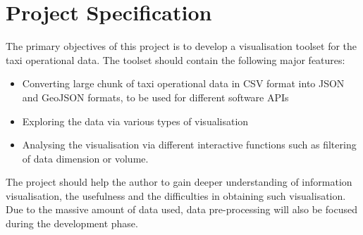 \documentclass[doc,natbib]{apa6}
\begin{document}
\section{Project Specification}
\label{sec3}

The primary objectives of this project is to develop a visualisation toolset for the taxi operational data. The toolset should contain the following major features:
\begin{itemize}
	\item Converting large chunk of taxi operational data in CSV format into JSON and GeoJSON formats, to be used for different software APIs
	\item Exploring the data via various types of visualisation
	\item Analysing the visualisation via different interactive functions such as filtering of data dimension or volume. 
\end{itemize}

The project should help the author to gain deeper understanding of information visualisation, the usefulness and the difficulties in obtaining such visualisation. Due to the massive amount of data used, data pre-processing will also be focused during the development phase.
\end{document}
